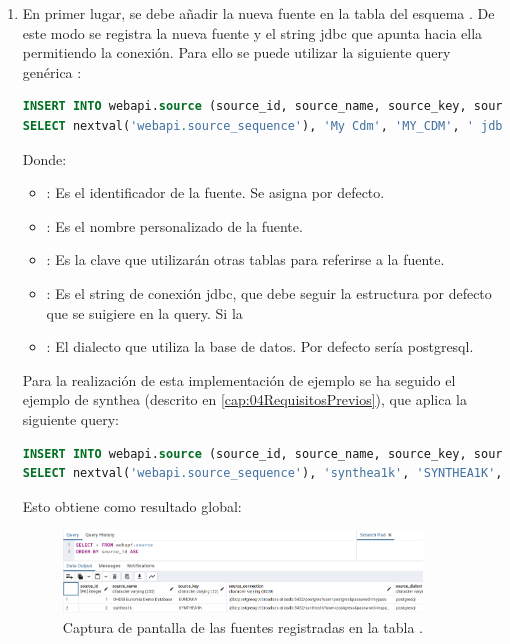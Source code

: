 \begin{enumerate}
    \item En primer lugar, se debe añadir la nueva fuente en la tabla  del esquema . De este modo se registra la nueva fuente y el string jdbc que apunta hacia ella permitiendo la conexión. Para ello se puede utilizar la siguiente query genérica \cite{githubCDMConfiguration}:

\begin{lstlisting}[language=sql]
INSERT INTO webapi.source (source_id, source_name, source_key, source_connection, source_dialect) 
SELECT nextval('webapi.source_sequence'), 'My Cdm', 'MY_CDM', ' jdbc:postgresql://server:5432/cdm?user={user}&password={password}', 'postgresql';
\end{lstlisting}

    Donde:
    \begin{itemize}
        \item {}: Es el identificador de la fuente. Se asigna por defecto.
        \item {}: Es el nombre personalizado de la fuente.
        \item {}: Es la clave que utilizarán otras tablas para referirse a la fuente.
        \item {}: Es el string de conexión jdbc, que debe seguir la estructura por defecto que se suigiere en la query. Si la
        \item {}: El dialecto que utiliza la base de datos. Por defecto sería postgresql.
    \end{itemize}

    Para la realización de esta implementación de ejemplo se ha seguido el ejemplo de synthea (descrito en \ref{cap:04RequisitosPrevios}), que aplica la siguiente query:

\begin{lstlisting}[language=sql]
INSERT INTO webapi.source (source_id, source_name, source_key, source_connection, source_dialect) 
SELECT nextval('webapi.source_sequence'), 'synthea1k', 'SYNTHEA1K', ' jdbc:postgresql://broadsea-atlasdb:5432/synthea1k?user=postgres&password=mypass', 'postgresql';
\end{lstlisting}

    Esto obtiene como resultado global:

\begin{figure}[H]
    \centering
    \includegraphics[width=0.90\textwidth]{figures/querySource.png}
    \caption{Captura de pantalla de las fuentes registradas en la tabla .}
    \label{fig:querySource}
\end{figure}
    


\end{enumerate}
